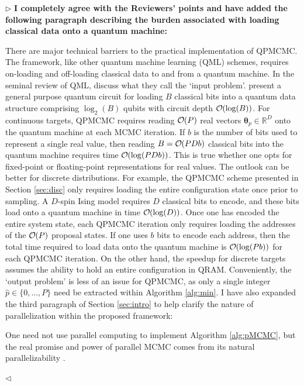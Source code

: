 \documentclass[12pt]{article}
\newenvironment{reply}{$\triangleright$\bfseries}{$\triangleleft$}
\renewenvironment{quote}
               {\list{}{\rightmargin\leftmargin}%
                \item\relax\normalfont}
               {\endlist}
\newcommand{\order}[1]{{\cal O}\hspace{-0.2em}\left( #1 \right)}
\newcommand{\ttheta}{\boldsymbol{\theta}}
\begin{document}
\begin{reply}
I completely agree with the Reviewers' points and have added the following paragraph describing the burden associated with loading classical data onto a quantum machine:
\begin{quote}
There are major technical barriers to the practical implementation of QPMCMC.  The framework, like other quantum machine learning (QML) schemes, requires on-loading and off-loading classical data to and from a quantum machine.  In the seminal review of QML, \citet{biamonte2017quantum} discuss what they call the `input problem'.  \citet{cortese2018loading} present a general purpose quantum circuit for loading $B$ classical bits into a quantum data structure comprising $\log_2 (B)$ qubits with circuit depth $\order{\log (B)}$.  For continuous targets, QPMCMC requires reading $\order{P}$ real vectors $\ttheta_p\in \mathbb{R}^D$ onto the quantum machine at each MCMC iteration.  If $b$ is the number of bits used to represent a single real value, then reading $B=\order{PDb}$ classical bits into the quantum machine requires time $\order{\log (PDb)}$.  This is true whether one opts for fixed-point \citep{jordan2005fast} or floating-point \citep{haener2018quantum} representations for real values.  The outlook can be better for discrete distributions.  For example, the QPMCMC scheme presented in Section \ref{sec:disc} only requires loading the entire configuration state once prior to sampling.  A $D$-spin Ising model requires $D$ classical bits to encode, and these bits load onto a quantum machine in time $\order{\log(D)}$.  Once one has encoded the entire system state, each QPMCMC iteration only requires loading the addresses of the $\order{P}$ proposal states. If one uses $b$ bits to encode each address, then the total time required to load data onto the quantum machine is $\order{\log(Pb)}$ for each QPMCMC iteration.  On the other hand, the speedup for discrete targets assumes the ability to hold an entire configuration in QRAM.
Conveniently, the `output problem' is less of an issue for QPMCMC, as only a single integer $\hat{p} \in \{0,\dots,P\}$ need be extracted within Algorithm \ref{alg:min}.
\end{quote}
I have also expanded the third paragraph of Section \ref{sec:intro} to help clarify the nature of parallelization within the proposed framework:
\begin{quote}
	One need not use parallel computing to implement Algorithm \ref{alg:pMCMC}, but the real promise and power of parallel MCMC comes from its natural parallelizability \citep{calderhead2014general}. 

\end{quote}
\end{reply}
\end{document}
